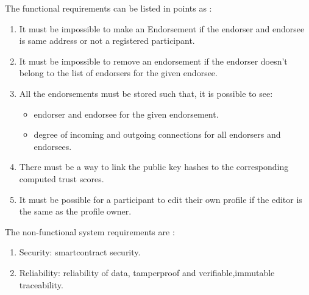 The functional requirements can be listed in points as : \\
\begin{enumerate}
	\item It must be impossible to make an Endorsement if the endorser and
		endorsee is same address or not a registered participant.
	\item It must be impossible to remove an endorsement if the endorser
		doesn't belong to the list of endorsers for the given endorsee.
	\item All the endorsements must be stored such that, it is possible to see: 
		\begin{itemize}
			\item endorser and endorsee for the given endorsement.
			\item degree of incoming and outgoing connections for all endorsers and endorsees.
		\end{itemize}
	\item There must be a way to link the public key hashes to the
		corresponding computed trust scores. 
	\item It must be possible for a participant to edit their own profile if
		the editor is the same as the profile owner. 
\end{enumerate}

The non-functional system requirements are : \\
\begin{enumerate}
	\item Security: smartcontract security.  
	\item Reliability: reliability of data, tamperproof and verifiable,immutable traceability.
\end{enumerate}

